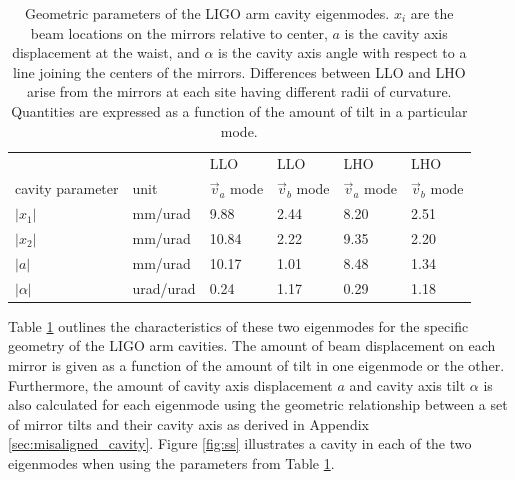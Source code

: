 \begin{table}
\centering
\caption[Geometric parameters of the LIGO arm cavity
  eigenmodes]{Geometric parameters of the LIGO arm cavity
  eigenmodes. $x_i$ are the beam locations on the mirrors relative
  to center, $a$ is the cavity axis displacement at the waist, and
  $\alpha$ is the cavity axis angle with respect to a line joining the
  centers of the mirrors. Differences between LLO and LHO arise from the
  mirrors at each site having different radii of curvature. Quantities
  are expressed as a function of the amount of tilt in a particular mode.}
\begin{tabular}{l l l l l l}
\hline
& & LLO & LLO & LHO & LHO \\
cavity parameter & unit & $\vec{v}_a$ mode & $\vec{v}_b$ mode & $\vec{v}_a$ mode & $\vec{v}_b$ mode \\
\hline
$|x_1|$ & mm/urad & 9.88 & 2.44 & 8.20 & 2.51\\
$|x_2|$ & mm/urad & 10.84 & 2.22 & 9.35 & 2.20\\
$|a|$ & mm/urad & 10.17 & 1.01 & 8.48 & 1.34 \\
$|\alpha|$ & urad/urad & 0.24 & 1.17 & 0.29 & 1.18 \\
\hline
\end{tabular}
\label{table:cav_geometric}
\end{table}


Table \ref{table:cav_geometric} outlines the characteristics of these
two eigenmodes for the specific geometry of the LIGO arm cavities. The
amount of beam displacement on each mirror is given as a function of
the amount of tilt in one eigenmode or the other. Furthermore, the
amount of cavity axis displacement $a$ and cavity axis tilt $\alpha$
is also calculated for each eigenmode using the geometric relationship
between a set of mirror tilts and their cavity axis as derived in
Appendix \ref{sec:misaligned_cavity}. Figure \ref{fig:ss} illustrates
a cavity in each of the two eigenmodes when using the parameters from
Table \ref{table:cav_geometric}.


